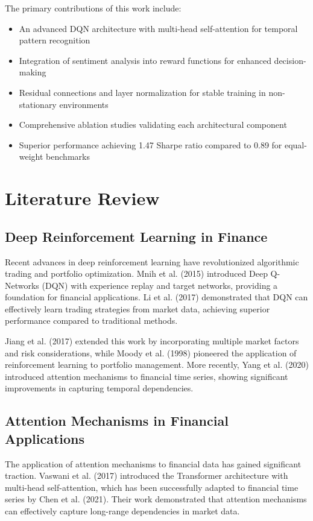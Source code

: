 \documentclass[12pt,a4paper]{article}
\begin{document}
The primary contributions of this work include:
\begin{itemize}
\item An advanced DQN architecture with multi-head self-attention for temporal pattern recognition
\item Integration of sentiment analysis into reward functions for enhanced decision-making
\item Residual connections and layer normalization for stable training in non-stationary environments
\item Comprehensive ablation studies validating each architectural component
\item Superior performance achieving 1.47 Sharpe ratio compared to 0.89 for equal-weight benchmarks
\end{itemize}

\section{Literature Review}

\subsection{Deep Reinforcement Learning in Finance}

Recent advances in deep reinforcement learning have revolutionized algorithmic trading and portfolio optimization. Mnih et al. (2015) introduced Deep Q-Networks (DQN) with experience replay and target networks, providing a foundation for financial applications. Li et al. (2017) demonstrated that DQN can effectively learn trading strategies from market data, achieving superior performance compared to traditional methods.

Jiang et al. (2017) extended this work by incorporating multiple market factors and risk considerations, while Moody et al. (1998) pioneered the application of reinforcement learning to portfolio management. More recently, Yang et al. (2020) introduced attention mechanisms to financial time series, showing significant improvements in capturing temporal dependencies.

\subsection{Attention Mechanisms in Financial Applications}

The application of attention mechanisms to financial data has gained significant traction. Vaswani et al. (2017) introduced the Transformer architecture with multi-head self-attention, which has been successfully adapted to financial time series by Chen et al. (2021). Their work demonstrated that attention mechanisms can effectively capture long-range dependencies in market data.
\end{document}
